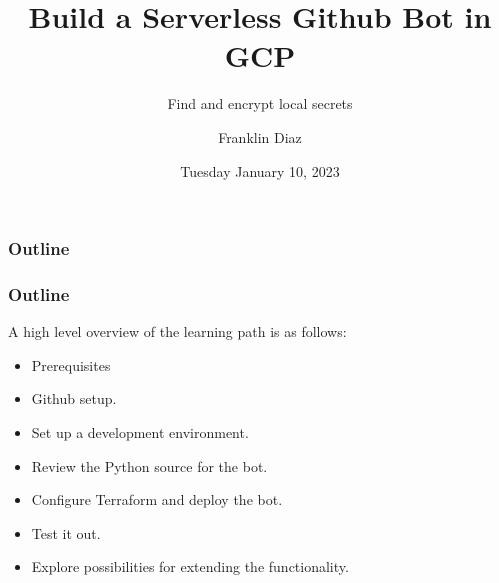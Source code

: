 \documentclass[aspectratio=169]{beamer}
\title{Build a Serverless Github Bot in GCP}
\subtitle{Find and encrypt local secrets}
\author{Franklin Diaz}
\institute{DE:AD:10:C5}
\date{Tuesday January 10, 2023}
\begin{document}
\frame{\titlepage}




\begin{frame}
    \frametitle{Outline}

    \vspace{2mm}
\end{frame}

\begin{frame}
    \frametitle{Outline}

    A high level overview of the learning path is as follows:

    \begin{raggedright}
        \begin{itemize}
            \item Prerequisites
            \item Github setup.
            \item Set up a development environment.
            \item Review the Python source for the bot.
            \item Configure Terraform and deploy the bot.
            \item Test it out.
            \item Explore possibilities for extending the functionality.
        \end{itemize}
    \end{raggedright}
    \vspace{2mm}
\end{frame}
\end{document}

